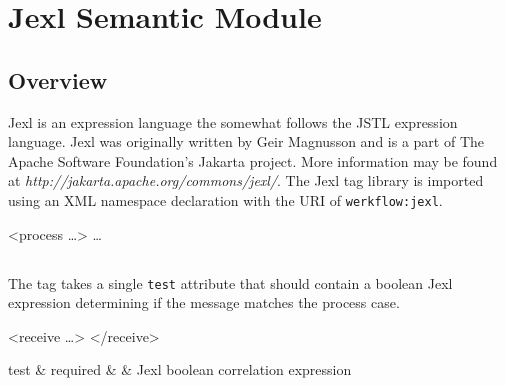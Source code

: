 \chapter{Jexl Semantic Module}

\section{Overview}

Jexl is an expression language the somewhat follows the JSTL
expression language.  Jexl was originally written by Geir
Magnusson and is a part of The Apache Software Foundation's 
Jakarta project.  More information may be found at
\emph{http://jakarta.apache.org/commons/jexl/}.
The Jexl tag library is imported using an XML namespace
declaration with the URI of \verb|werkflow:jexl|.

\begin{codelisting}
<process  \dots>
    \dots
\end{codelisting}



\section{}

The  tag takes a single \verb|test| attribute
that should contain a boolean Jexl expression determining if
the message matches the process case.

\begin{codelisting}
<receive \dots>
</receive>
\end{codelisting}

\begin{attrDefs}
test		&	required	&			& Jexl boolean correlation expression \\
\end{attrDefs}
